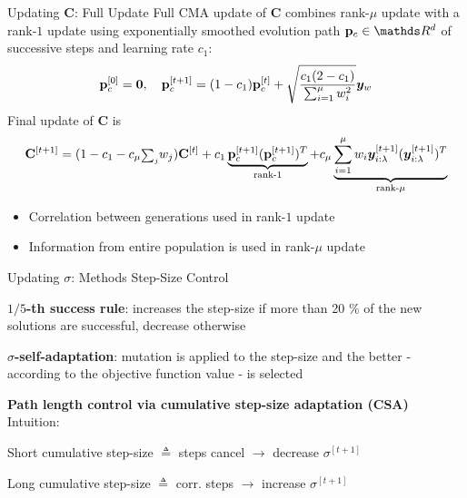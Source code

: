 \documentclass[11pt,compress,t,notes=noshow, xcolor=table]{beamer}
\begin{document}
\begin{framev}[fs=small]{Updating $\mathbf{C}$: Full Update}
Full CMA update of $\mathbf{C}$ combines rank-$\mu$ update with a rank-$1$ update using exponentially smoothed evolution path $\mathbf{p}_c \in \R^{d}$ of successive steps and learning rate $c_1$:
$$
\mathbf{p}_{c}^{[0]}=\bm{0}, \quad \mathbf{p}_{c}^{[t+1]} = (1-c_1)\mathbf{p}_{c}^{[t]} + \sqrt{\frac{c_1(2-c_1)}{\sum_{i=1}^{\mu}w_i^2}}\bm{y}_w
$$
Final update of $\mathbf{C}$ is
$$
\mathbf{C}^{[t+1]}=(1-c_1-c_{\mu}{\scriptstyle\sum_j} w_j)\mathbf{C}^{[t]}+c_1 \underbrace{\mathbf{p}_{c}^{[t+1]}(\mathbf{p}_{c}^{[t+1]})^T}_{\text{rank-$1$}}+c_{\mu}\underbrace{\sum_{i=1}^{\mu}w_i \bm{y}_{i:\lambda}^{[t+1]}(\bm{y}_{i:\lambda}^{[t+1]})^T}_{\text{rank-$\mu$}}
$$
\begin{itemize}
\item Correlation between generations used in rank-$1$ update
\item Information from entire population is used in rank-$\mu$ update
\end{itemize}
\end{framev}


\begin{framei}[sep=L, fs=small]{Updating $\sigma$: Methods Step-Size Control}
\item \textbf{$1/5$-th success rule}: increases the step-size if more than 20 \% of the new solutions are successful, decrease otherwise
\item \textbf{$\sigma$-self-adaptation}: mutation is applied to the step-size and the better - according to the objective function value - is selected
\item \textbf{Path length control via cumulative step-size adaptation (CSA)}\\ Intuition:
\begin{itemizeS}
\item Short cumulative step-size $\triangleq$ steps cancel $\to$ decrease $\sigma^{[t+1]}$
\item Long cumulative step-size $\triangleq$ corr. steps $\to$ increase $\sigma^{[t+1]}$
\end{itemizeS}
\vfill
{}
\end{framei}

\endlecture
\end{document}
